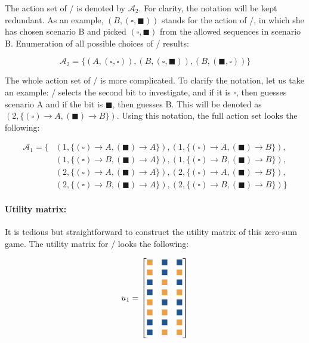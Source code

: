 \documentclass{article}
\newcommand{\wbox}{\textcolor{w}{\blacksquare}}
\newcommand{\lbox}{\textcolor{l}{\blacksquare}}
\newcommand{\wb}{\square}
\newcommand{\bb}{\blacksquare}
\theoremstyle{definition}
\begin{document}
The action set of \PII/ is denoted by $\mathcal{A}_2$.
For clarity, the notation will be kept redundant. As an example, $(B,(\wb,\bb))$ stands for the action of \PII/, in which she has chosen scenario B and picked $(\wb,\bb)$ from the allowed sequences in scenario B. Enumeration of all possible choices of \PII/ results:

\begin{equation}
    \label{eq:SimplestFisher_A2}
    \mathcal{A}_2 = \{ (A, (\wb,\wb)), (B, (\wb,\bb)) ,(B,(\bb,\wb)) \}
\end{equation}

The whole action set of \PI/ is more complicated.
To clarify the notation, let us take an example: \PI/ selects the second bit to investigate, and if it is $\wb$, then guesses scenario A and if the bit is $\bb$, then guesses B. This will be denoted as $(2,\{(\wb) \to A, (\bb) \to B\})$. Using this notation, the full action set looks the following:

\begin{equation}
\begin{split}
\mathcal{A}_1 = \{ 
& (1,\{(\wb) \to A, (\bb) \to A\}), (1,\{(\wb) \to A, (\bb) \to B\}), \\
& (1,\{(\wb) \to B, (\bb) \to A\}), (1,\{(\wb) \to B, (\bb) \to B\}), \\
& (2,\{(\wb) \to A, (\bb) \to A\}), (2,\{(\wb) \to A, (\bb) \to B\}), \\
& (2,\{(\wb) \to B, (\bb) \to A\}), (2,\{(\wb) \to B, (\bb) \to B\})
\}
\end{split}
\end{equation}

\vfill

\paragraph{Utility matrix:}
It is tedious but straightforward to construct the utility matrix of this zero-sum game. 
The utility matrix for \PI/ looks the following:

\setcounter{MaxMatrixCols}{12}
\begin{equation}
u_1=
\begin{bmatrix}
\wbox & \lbox & \lbox \\
\wbox & \lbox & \wbox \\
\lbox & \wbox & \lbox \\
\lbox & \wbox & \wbox \\
\wbox & \lbox & \lbox \\
\wbox & \wbox & \lbox \\
\lbox & \lbox & \wbox \\
\lbox & \wbox & \wbox
\end{bmatrix}
\end{equation}
\end{document}
